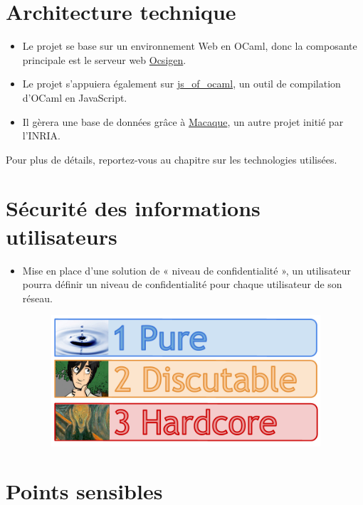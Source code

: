 \documentclass{life-fr}
\begin{document}
\section{Architecture technique}

\begin{itemize}
  \item Le projet se base sur un environnement Web en OCaml, donc la composante principale est le serveur web \href{http://ocsigen.org/}{Ocsigen}.
  \item Le projet s’appuiera également sur \href{http://ocsigen.org/js_of_ocaml/}{js\_of\_ocaml}, un outil de compilation d’OCaml en JavaScript.
  \item Il gèrera une base de données grâce à \href{http://ocsigen.org/macaque/}{Macaque}, un autre projet initié par l’INRIA.
\end{itemize}

Pour plus de détails, reportez-vous au chapitre sur les technologies utilisées.

\section{Sécurité des informations utilisateurs}

\begin{itemize}
  \item Mise en place d’une solution de « niveau de confidentialité », un utilisateur pourra définir un niveau de confidentialité pour chaque utilisateur de son réseau. 

\begin{figure}[H]
  \begin{center}
    \includegraphics[width=10cm]{img/confidentialite.png}
  \end{center}
\end{figure}

\end{itemize}

\section{Points sensibles}
\end{document}
